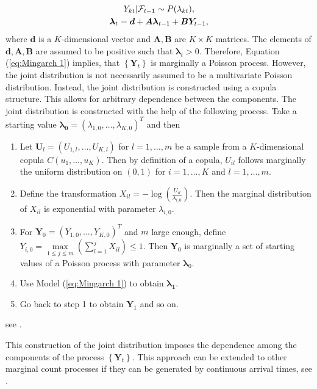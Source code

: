\begin{equation}
\begin{gathered}
Y_{kt} | \mathcal{F}_{t-1} \sim P(\lambda_{kt}), \\
\bm{\lambda}_t = \bm{d} + \bm{A}\bm{\lambda}_{t-1} + \bm{B}\bm{Y}_{t-1},
\label{eq:Mingarch 1}
\end{gathered}
\end{equation}
%
where $\bm{d}$ is a $K$-dimensional vector and $\bm{A},\bm{B}$ are $K\times K$ matrices. The elements of $\bm{d},\bm{A},\bm{B}$ are assumed to be positive such that $\bm{\lambda}_t > 0$. Therefore, Equation (\ref{eq:Mingarch 1}) implies, that $\left\{\bm{Y}_t\right\}$ is marginally a Poisson process. However, the joint distribution is not necessarily assumed to be a multivariate Poisson distribution. Instead, the joint distribution is constructed using a copula structure. This allows for arbitrary dependence between the components. The joint distribution is constructed with the help of the following process. Take a starting value $\bm{\lambda_0}=(\lambda_{1,0},\ldots,\lambda_{K,0})^T$ and then

\begin{enumerate}
	\item Let $\bm{U}_l=(U_{1,l},\ldots,U_{K,l})$ for $l=1,\ldots,m$ be a sample from a $K$-dimensional copula $C(u_1,\ldots,u_K)$. Then by definition of a copula, $U_{il}$ follows marginally the uniform distribution on $(0,1)$ for $i=1,\ldots,K$ and $l=1,\ldots,m$. 
	\item Define the transformation $X_{il} = -\log (\frac{U_{il}}{\lambda_{i,0}})$. Then the marginal distribution of $X_{il}$ is exponential with parameter $\lambda_{i,0}$. 
	\item For $\bm{Y}_0=(Y_{1,0},\ldots,Y_{K,0})^T$ and $m$ large enough, define $Y_{i,0} = \max\limits_{1\leq j \leq m}(\sum_{l=1}^j X_{il})\leq 1$. Then $\bm{Y}_0$ is marginally a set of starting values of a Poisson process with parameter $\bm{\lambda}_0$. 
	\item Use Model (\ref{eq:Mingarch 1}) to obtain $\bm{\lambda_1}$.
	\item Go back to step 1 to obtain $\bm{Y}_1$ and so on. 
\end{enumerate}
%
see \textcite{Fokianos:2020}.

This construction of the joint distribution imposes the dependence among the components of the process $\left\{\bm{Y}_t\right\}$. This approach can be extended to other marginal count processes if they can be generated by continuous arrival times, see \textcite{Fokianos:2020}. 

